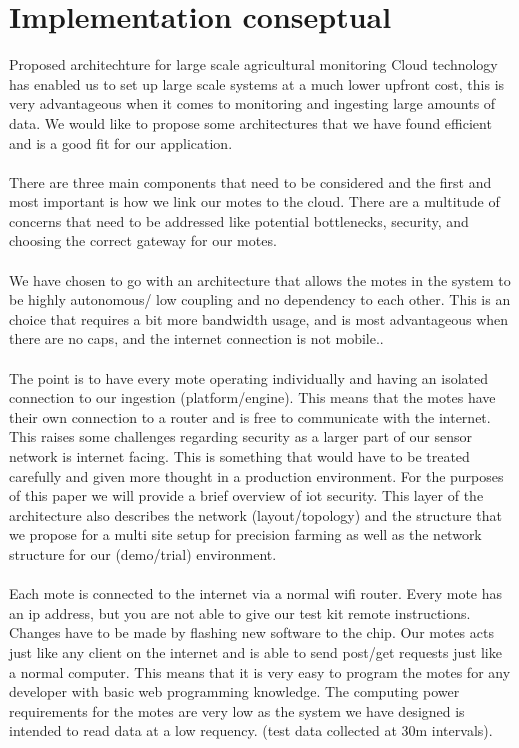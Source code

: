 \documentclass[]{uiophd}
\begin{document}
\section{Implementation conseptual}
Proposed architechture for large scale agricultural monitoring
Cloud technology has enabled us to set up large scale systems at a much lower upfront cost, this is very advantageous when it comes to monitoring and ingesting large amounts of data. We would like to propose some architectures that we have found efficient and is a good fit for our application. 
\\\\
There are three main components that need to be considered and the first and most important is how we link our motes to the cloud. There are a multitude of concerns that need to be addressed like potential bottlenecks, security, and choosing the correct gateway for our motes.
\\\\
We have chosen to go with an architecture that allows the motes in the system to be highly autonomous/ low coupling and no dependency to each other. This is an choice that requires a bit more bandwidth usage, and is most advantageous when there are no caps, and the internet connection is not mobile..
\\\\
The point is to have every mote operating individually and having an isolated connection to our ingestion (platform/engine). This means that the motes have their own connection to a router and is free to communicate with the internet. This raises some challenges regarding security as a larger part of our sensor network is internet facing. This is something that would have to be treated carefully and given more thought in a production environment. For the purposes of this paper we will provide a brief overview of iot security. This layer of the architecture also describes the network (layout/topology) and the structure that we propose for a multi site setup for precision farming as well as the network structure for our (demo/trial) environment.
\\\\
Each mote is connected to the internet via a normal wifi router. Every mote has an ip address, but you are not able to give our test kit remote instructions. Changes have to be made by flashing new software to the chip. Our motes acts just like any client on the internet and is able to send post/get requests just like a normal computer. This means that it is very easy to program the motes for any developer with basic web programming knowledge. The computing power requirements for the motes are very low as the system we have designed is intended to read data at a low requency. (test data collected at 30m intervals).
\end{document}
